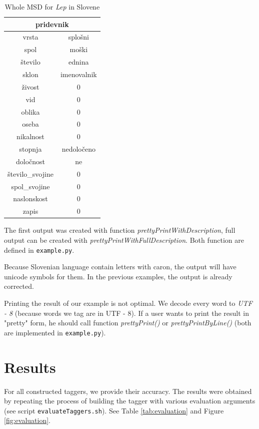 \documentclass[10pt, conference, compsocconf]{IEEEtran}
\begin{document}
\begin{table}[h]
\begin{center}
\begin{tabular}{c|c}
\multicolumn{2}{c}{pridevnik}\\\hline\hline
vrsta & splošni \\
spol & moški \\
število & ednina \\
sklon & imenovalnik \\
živost & 0 \\
vid & 0 \\
oblika & 0 \\
oseba & 0 \\
nikalnost & 0 \\
stopnja & nedoločeno \\
določnost & ne \\
število\_svojine & 0 \\
spol\_svojine & 0 \\
naslonskost & 0 \\
zapis & 0 \\
\end{tabular}
\end{center}
\caption{Whole MSD for \textit{Lep} in Slovene}
\label{tab:MSDLep}
\end{table}

The first output was created with function \textit{prettyPrintWithDescription}, full output can be created with \textit{prettyPrintWithFullDescription}. Both function are defined in \texttt{example.py}.
\par
Because Slovenian language contain letters with caron, the output will have unicode symbols for them. In the previous examples, the output is already corrected.

Printing the result of our example is not optimal. We decode every word to \textit{UTF - 8} (because words we tag are in UTF - 8). If a user wants to print the result in "pretty" form, he should call function \textit{prettyPrint()} or \textit{prettyPrintByLine()} (both are implemented in \texttt{example.py}).

\section{Results} %
\label{results}
For all constructed taggers, we provide their accuracy. The results were obtained by repeating the process of building the tagger with various evaluation arguments (see script \texttt{evaluateTaggers.sh}). See Table \ref{tab:evaluation} and Figure \ref{fig:evaluation}.
\end{document}

